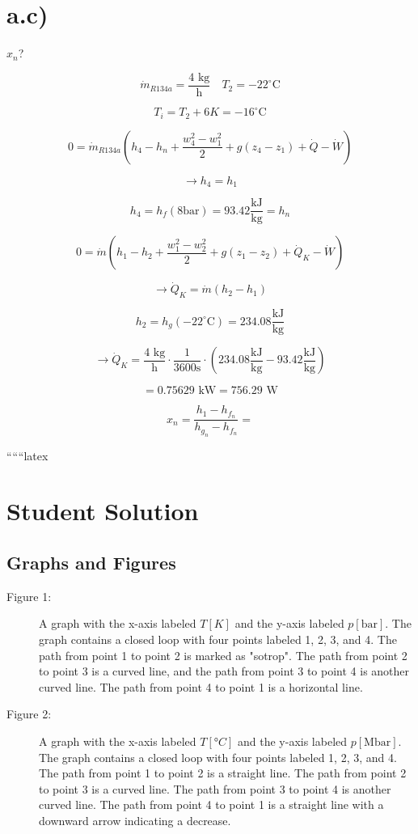 \section*{a.c)}
$x_n$?

\[
\dot{m}_{R134a} = \frac{4 \text{ kg}}{\text{h}} \quad T_2 = -22^\circ \text{C}
\]

\[
T_i = T_2 + 6K = -16^\circ \text{C}
\]


\[
0 = \dot{m}_{R134a} \left( h_4 - h_n + \frac{w_4^2 - w_1^2}{2} + g (z_4 - z_1) + \dot{Q} - \dot{W} \right)
\]

\[
\rightarrow h_4 = h_1
\]

\[
h_4 = h_f (8 \text{bar}) = 93.42 \frac{\text{kJ}}{\text{kg}} = h_n
\]


\[
0 = \dot{m} \left( h_1 - h_2 + \frac{w_1^2 - w_2^2}{2} + g (z_1 - z_2) + \dot{Q}_K - \dot{W} \right)
\]

\[
\rightarrow \dot{Q}_K = \dot{m} (h_2 - h_1)
\]

\[
h_2 = h_g \left( -22^\circ \text{C} \right) = 234.08 \frac{\text{kJ}}{\text{kg}}
\]

\[
\rightarrow \dot{Q}_K = \frac{4 \text{ kg}}{\text{h}} \cdot \frac{1}{3600 \text{s}} \cdot \left( 234.08 \frac{\text{kJ}}{\text{kg}} - 93.42 \frac{\text{kJ}}{\text{kg}} \right)
\]

\[
= 0.75629 \text{ kW} = 756.29 \text{ W}
\]

\[
x_n = \frac{h_1 - h_{f_n}}{h_{g_n} - h_{f_n}} =
\]

``````latex


\section*{Student Solution}

\subsection*{Graphs and Figures}

\begin{description}
    \item[Figure 1:] A graph with the x-axis labeled $T[K]$ and the y-axis labeled $p[\text{bar}]$. The graph contains a closed loop with four points labeled 1, 2, 3, and 4. The path from point 1 to point 2 is marked as "sotrop". The path from point 2 to point 3 is a curved line, and the path from point 3 to point 4 is another curved line. The path from point 4 to point 1 is a horizontal line.
    
    \item[Figure 2:] A graph with the x-axis labeled $T[°C]$ and the y-axis labeled $p[\text{Mbar}]$. The graph contains a closed loop with four points labeled 1, 2, 3, and 4. The path from point 1 to point 2 is a straight line. The path from point 2 to point 3 is a curved line. The path from point 3 to point 4 is another curved line. The path from point 4 to point 1 is a straight line with a downward arrow indicating a decrease.
\end{description}